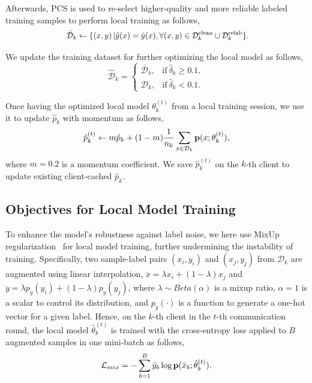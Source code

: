 \documentclass[letterpaper]{article} %
\begin{document}
Afterwards, PCS is used to re-select higher-quality and more reliable labeled training samples to perform local training as follows,
\begin{equation}
    \label{Equation:Reselect}
    \fontsize{9.55pt}{12pt}\selectfont
    \begin{split}
        ~\bar{\mathcal{D}}_{k} \leftarrow \{\left(x, y\right) | \hat{y}(x)=\tilde{y}(x), \forall (x, y)\in \mathcal{D}_{k}^{\text{clean}} \cup \mathcal{D}_{k}^{\text{relab}}\}.
    \end{split}
\end{equation}

We update the training dataset for further optimizing the local model as follows,
\begin{equation}
    \label{Equation:Data-Split}
    \hat{\mathcal{D}}_{k} =
        \begin{cases}
            \bar{\mathcal{D}}_{k}, &  \text{if}~\hat{\delta}_{k} \ge 0.1, \\
            \mathcal{D}_{k},  & \text{if}~\hat{\delta}_{k} < 0.1.
        \end{cases}
\end{equation}

Once having the optimized local model $\theta^{(t)}_k$ from a local training session, we use it to update $\hat{p}_{k}$ with momentum as follows,
\begin{equation}
    \label{Equation:Momentum-p}
    \hat{p}^{(t)}_{k} \leftarrow m\hat{p}_{k} +  (1-m)\frac{1}{n_{k}}\sum_{x\in \mathcal{D}_{k}} \textbf{\text{p}}(x;{\theta}^{(t)}_{k}),
\end{equation}
where $m=0.2$ is a momentum coefficient. We save $\hat{p}^{(t)}_{k}$ on the $k$-th client to update existing client-cached $\hat{p}_{k}$.

\subsection{Objectives for Local Model Training}

To enhance the model's robustness against label noise, we here use MixUp regularization~\cite{zhang2018mixup} for local model training, further undermining the instability of training. Specifically, two sample-label pairs $(x_i, y_i)$ and $(x_j, y_j)$ from $\hat{\mathcal{D}}_{k}$ are augmented using linear interpolation, ${\ddot{x}}={{\lambda}}{x_i}+({1-{\lambda}}){x_j}$ and ${\ddot{y}}={{\lambda}}{p_y(y_i)}+({1-{\lambda}}){p_y(y_j)}$, where ${\lambda}\sim Beta(\alpha)$ is a mixup ratio, $\alpha=1$ is a scalar to control its distribution, and $p_y(\cdot)$ is a function to generate a one-hot vector for a given label. Hence, on the $k$-th client in the $t$-th communication round, the local model $\hat{{\theta}}^{(t)}_k$ is trained with the cross-entropy loss applied to $B$ augmented samples in one mini-batch as follows,
\begin{equation}
    {\mathcal{L}}_{mix}=-\sum_{b=1}^{B}\ddot{y}_b\log{\textbf{\text{p}}(\ddot{x}_b;\hat{{\theta}}^{(t)}_k)}.
\end{equation}
\end{document}
